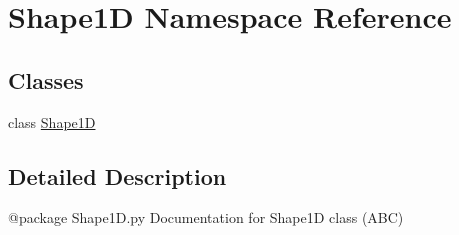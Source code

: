 \hypertarget{namespaceShape1D}{\section{Shape1\-D Namespace Reference}
\label{namespaceShape1D}
}
\subsection*{Classes}
\begin{DoxyCompactItemize}
\item 
class \hyperlink{classShape1D_1_1Shape1D}{Shape1\-D}
\end{DoxyCompactItemize}


\subsection{Detailed Description}
\begin{DoxyVerb}@package Shape1D.py
Documentation for Shape1D class (ABC)
\end{DoxyVerb}
 